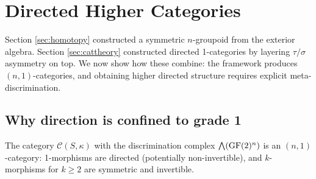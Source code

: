 \section{Directed Higher Categories}\label{sec:directed-higher}

Section \ref{sec:homotopy} constructed a symmetric $n$-groupoid
from the exterior algebra. Section \ref{sec:cattheory} constructed
directed 1-categories by layering $\tau/\sigma$ asymmetry on top.
We now show how these combine: the framework produces
$(n,1)$-categories, and obtaining higher directed structure
requires explicit meta-discrimination.

\subsection{Why direction is confined to grade 1}

\begin{theorem}\label{thm:n1cat}
The category $\mathcal{C}(S,\kappa)$ with the
discrimination complex $\bigwedge(\operatorname{GF}(2)^n)$ is an
$(n,1)$-category: 1-morphisms are directed (potentially
non-invertible), and $k$-morphisms for $k \geq 2$ are
symmetric and invertible.
\end{theorem}

